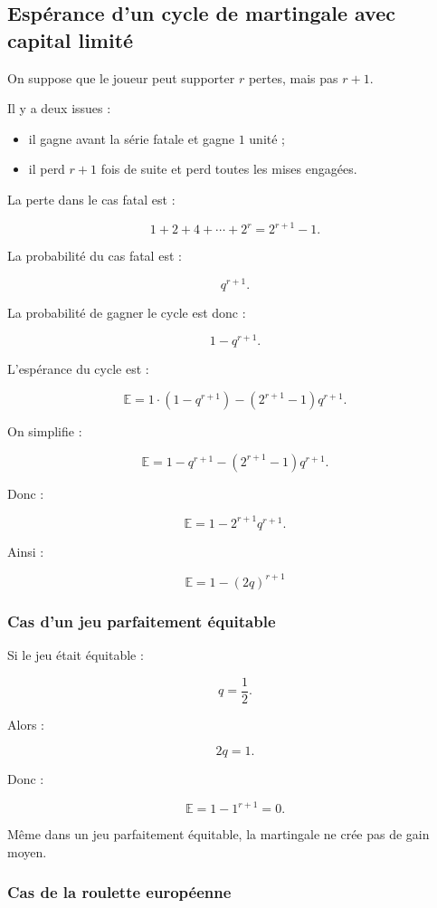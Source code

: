\documentclass[11pt,a4paper]{article}
\begin{document}
\subsection{Espérance d'un cycle de martingale avec capital limité}

On suppose que le joueur peut supporter \(r\) pertes, mais pas \(r+1\).

Il y a deux issues :
\begin{itemize}
    \item il gagne avant la série fatale et gagne \(1\) unité ;
    \item il perd \(r+1\) fois de suite et perd toutes les mises engagées.
\end{itemize}

La perte dans le cas fatal est :

\[
1+2+4+\cdots+2^r=2^{r+1}-1.
\]

La probabilité du cas fatal est :

\[
q^{r+1}.
\]

La probabilité de gagner le cycle est donc :

\[
1-q^{r+1}.
\]

L'espérance du cycle est :

\[
\mathbb{E}
=
1\cdot(1-q^{r+1})
-
(2^{r+1}-1)q^{r+1}.
\]

On simplifie :

\[
\mathbb{E}
=
1-q^{r+1}-(2^{r+1}-1)q^{r+1}.
\]

Donc :

\[
\mathbb{E}
=
1-2^{r+1}q^{r+1}.
\]

Ainsi :

\[
\boxed{\mathbb{E}=1-(2q)^{r+1}}
\]

\subsubsection*{Cas d'un jeu parfaitement équitable}

Si le jeu était équitable :

\[
q=\frac12.
\]

Alors :

\[
2q=1.
\]

Donc :

\[
\mathbb{E}=1-1^{r+1}=0.
\]

Même dans un jeu parfaitement équitable, la martingale ne crée pas de gain moyen.

\subsubsection*{Cas de la roulette européenne}
\end{document}
